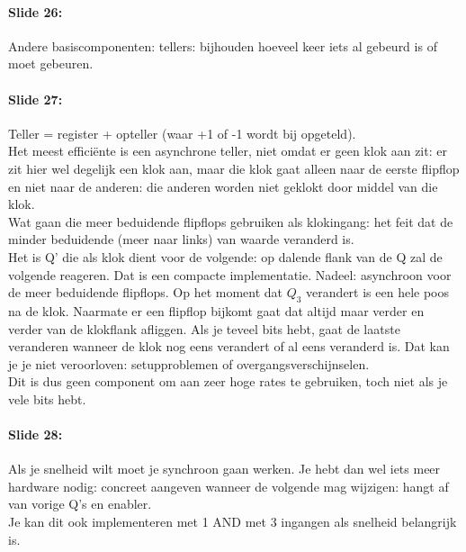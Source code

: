 \documentclass[10pt,a4paper]{book}
\begin{document}
\paragraph{Slide 26:} Andere basiscomponenten: tellers: bijhouden hoeveel keer iets al gebeurd is of moet gebeuren.

\paragraph{Slide 27:} Teller = register + opteller (waar +1 of -1 wordt bij opgeteld).\\
Het meest effici\"ente is een asynchrone teller, niet omdat er geen klok aan zit: er zit hier wel degelijk een klok aan, maar die klok gaat alleen naar de eerste flipflop en niet naar de anderen: die anderen worden niet geklokt door middel van die klok.\\
Wat gaan die meer beduidende flipflops gebruiken als klokingang: het feit dat de minder beduidende (meer naar links) van waarde veranderd is.\\
Het is Q' die als klok dient voor de volgende: op dalende flank van de Q zal de volgende reageren. Dat is een compacte implementatie. Nadeel: asynchroon voor de meer beduidende flipflops. Op het moment dat $Q_3$ verandert is een hele poos na de klok. Naarmate er een flipflop bijkomt gaat dat altijd maar verder en verder van de klokflank afliggen. Als je teveel bits hebt, gaat de laatste veranderen wanneer de klok nog eens verandert of al eens veranderd is. Dat kan je je niet veroorloven: setupproblemen of overgangsverschijnselen.\\
Dit is dus geen component om aan zeer hoge rates te gebruiken, toch niet als je vele bits hebt. 

\paragraph{Slide 28:} Als je snelheid wilt moet je synchroon gaan werken. Je hebt dan wel iets meer hardware nodig: concreet aangeven wanneer de volgende mag wijzigen: hangt af van vorige Q's en enabler.\\
Je kan dit ook implementeren met 1 AND met 3 ingangen als snelheid belangrijk is.
\end{document}
